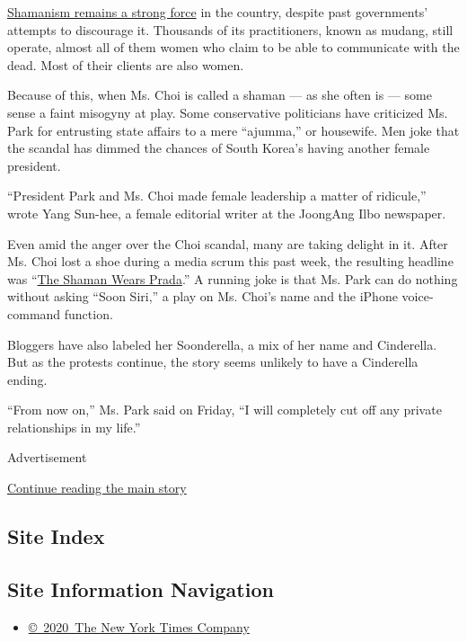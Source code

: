 \href{http://www.nytimes.com/2007/07/07/world/asia/07korea.html}{Shamanism
remains a strong force} in the country, despite past governments'
attempts to discourage it. Thousands of its practitioners, known as
mudang, still operate, almost all of them women who claim to be able to
communicate with the dead. Most of their clients are also women.

Because of this, when Ms. Choi is called a shaman --- as she often is
--- some sense a faint misogyny at play. Some conservative politicians
have criticized Ms. Park for entrusting state affairs to a mere
``ajumma,'' or housewife. Men joke that the scandal has dimmed the
chances of South Korea's having another female president.

``President Park and Ms. Choi made female leadership a matter of
ridicule,'' wrote Yang Sun-hee, a female editorial writer at the
JoongAng Ilbo newspaper.

Even amid the anger over the Choi scandal, many are taking delight in
it. After Ms. Choi lost a shoe during a media scrum this past week, the
resulting headline was
``\href{http://www.kyeonggi.com/?mod=news\&act=articleView\&idxno=1262640}{The
Shaman Wears Prada}.'' A running joke is that Ms. Park can do nothing
without asking ``Soon Siri,'' a play on Ms. Choi's name and the iPhone
voice-command function.

Bloggers have also labeled her Soonderella, a mix of her name and
Cinderella. But as the protests continue, the story seems unlikely to
have a Cinderella ending.

``From now on,'' Ms. Park said on Friday, ``I will completely cut off
any private relationships in my life.''

Advertisement

\protect\hyperlink{after-bottom}{Continue reading the main story}

\hypertarget{site-index}{%
\subsection{Site Index}\label{site-index}}

\hypertarget{site-information-navigation}{%
\subsection{Site Information
Navigation}\label{site-information-navigation}}

\begin{itemize}
\tightlist
\item
  \href{https://help.nytimes.com/hc/en-us/articles/115014792127-Copyright-notice}{©~2020~The
  New York Times Company}
\end{itemize}

